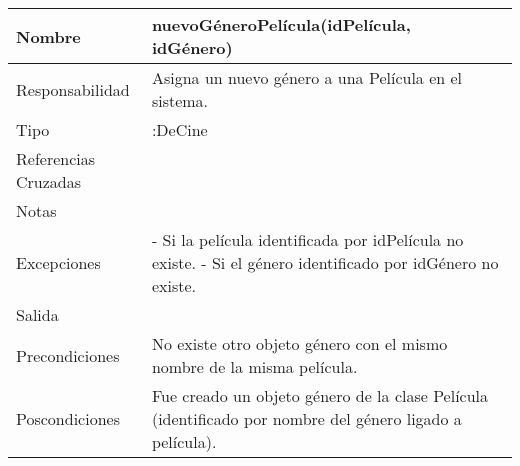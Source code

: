 \documentclass{article}
\begin{document}
\begin{table}[h]
\begin{tabular}{|l|l|l|l|l|l|}
\hline
\multicolumn{2}{|p{3cm}|}{Nombre} & \multicolumn{3}{p{8cm}|}{\textbf{nuevoGéneroPelícula(idPelícula, idGénero)}}\\
\hline
\multicolumn{2}{|p{3cm}|}{Responsabilidad} & \multicolumn{4}{p{8cm}|}{Asigna un nuevo género a una Película en el sistema.} \\
\hline
\multicolumn{2}{|p{3cm}|}{Tipo} & \multicolumn{4}{p{8cm}|}{:DeCine} \\
\hline
\multicolumn{2}{|p{3cm}|}{Referencias Cruzadas} & \multicolumn{4}{p{8cm}|}{} \\
\hline
\multicolumn{2}{|p{3cm}|}{Notas} & \multicolumn{4}{p{8cm}|}{} \\
\hline
\multicolumn{2}{|p{3cm}|}{Excepciones} & \multicolumn{4}{p{8cm}|}{- Si la película identificada por idPelícula no existe.
- Si el género identificado por idGénero no existe.
} \\
\hline
\multicolumn{2}{|p{3cm}|}{Salida} & \multicolumn{4}{p{8cm}|}{} \\
\hline
\multicolumn{2}{|p{3cm}|}{Precondiciones} & \multicolumn{4}{p{8cm}|}{No existe otro objeto género con el mismo nombre de la misma película.} \\
\hline
\multicolumn{2}{|p{3cm}|}{Poscondiciones} & \multicolumn{4}{p{8cm}|}{Fue creado un objeto género de la clase Película (identificado por nombre del género ligado a película).} \\
\hline
\end{tabular}
\end{table}
\end{document}
